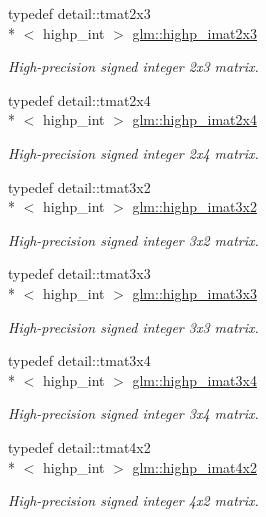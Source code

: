 \begin{DoxyCompactItemize}
typedef detail\-::tmat2x3\\*
$<$ highp\-\_\-int $>$ \hyperlink{group__gtc__matrix__integer_ga06f89e9faac42bc0ac6628e83244a488}{glm\-::highp\-\_\-imat2x3}
\begin{DoxyCompactList}\small\item\em High-\/precision signed integer 2x3 matrix. \end{DoxyCompactList}\item 
typedef detail\-::tmat2x4\\*
$<$ highp\-\_\-int $>$ \hyperlink{group__gtc__matrix__integer_gaf9ce65229f4b8fe1e956b83ca82cdfa7}{glm\-::highp\-\_\-imat2x4}
\begin{DoxyCompactList}\small\item\em High-\/precision signed integer 2x4 matrix. \end{DoxyCompactList}\item 
typedef detail\-::tmat3x2\\*
$<$ highp\-\_\-int $>$ \hyperlink{group__gtc__matrix__integer_gab33e4ccf70f2e1f2eae7c6ddfb594e3c}{glm\-::highp\-\_\-imat3x2}
\begin{DoxyCompactList}\small\item\em High-\/precision signed integer 3x2 matrix. \end{DoxyCompactList}\item 
typedef detail\-::tmat3x3\\*
$<$ highp\-\_\-int $>$ \hyperlink{group__gtc__matrix__integer_gaf44e40dda4b36c90b4a9210e7b936c93}{glm\-::highp\-\_\-imat3x3}
\begin{DoxyCompactList}\small\item\em High-\/precision signed integer 3x3 matrix. \end{DoxyCompactList}\item 
typedef detail\-::tmat3x4\\*
$<$ highp\-\_\-int $>$ \hyperlink{group__gtc__matrix__integer_gab0609d65fae60184ade419c6e4edc812}{glm\-::highp\-\_\-imat3x4}
\begin{DoxyCompactList}\small\item\em High-\/precision signed integer 3x4 matrix. \end{DoxyCompactList}\item 
typedef detail\-::tmat4x2\\*
$<$ highp\-\_\-int $>$ \hyperlink{group__gtc__matrix__integer_gaf7ffcc749993239f1871f1acd8b06cca}{glm\-::highp\-\_\-imat4x2}
\begin{DoxyCompactList}\small\item\em High-\/precision signed integer 4x2 matrix. \end{DoxyCompactList}\item 

\end{DoxyCompactItemize}
